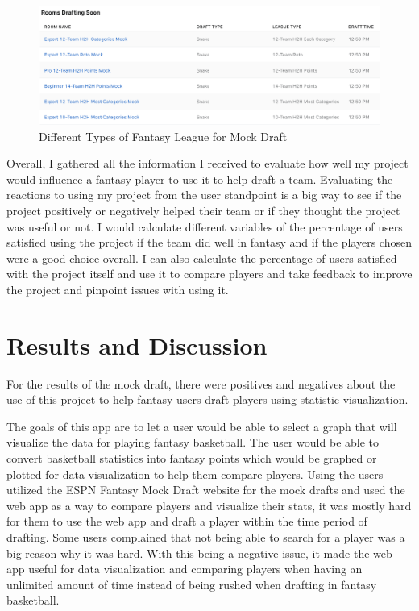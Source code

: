 \documentclass[10pt,twocolumn]{article}
\begin{document}
\begin{figure}
    \centering
    \includegraphics[width=.98\linewidth]{mockdraft.png}
    \caption{
        Different Types of Fantasy League for Mock Draft
    }
    \label{fig:second-page-5}
\end{figure}

Overall, I gathered all the information I received to evaluate how well my project would influence a fantasy player to use it to help draft a team. Evaluating the reactions to using my project from the user standpoint is a big way to see if the project positively or negatively helped their team or if they thought the project was useful or not. I would calculate different variables of the percentage of users satisfied using the project if the team did well in fantasy and if the players chosen were a good choice overall. I can also calculate the percentage of users satisfied with the project itself and use it to compare players and take feedback to improve the project and pinpoint issues with using it. 

\section{Results and Discussion}
For the results of the mock draft, there were positives and negatives about the use of this project to help fantasy users draft players using statistic visualization. 

The goals of this app are to let a user would be able to select a graph that will visualize the data for playing fantasy basketball. The user would be able to convert basketball statistics into fantasy points which would be graphed or plotted for data visualization to help them compare players. Using the users utilized the ESPN Fantasy Mock Draft\cite{fantasyDraft} website for the mock drafts and used the web app as a way to compare players and visualize their stats, it was mostly hard for them to use the web app and draft a player within the time period of drafting. Some users complained that not being able to search for a player was a big reason why it was hard. With this being a negative issue, it made the web app useful for data visualization and comparing players when having an unlimited amount of time instead of being rushed when drafting in fantasy basketball.
\end{document}
